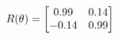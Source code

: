 \documentclass[preview]{standalone}
\begin{document}
\begin{align*}
\special{dvisvgm:raw <g id='unique000'>}R(\theta) = \begin{bmatrix}0.99 & 0.14\\-0.14 & 0.99\end{bmatrix}\special{dvisvgm:raw </g>}
\end{align*}
\end{document}
